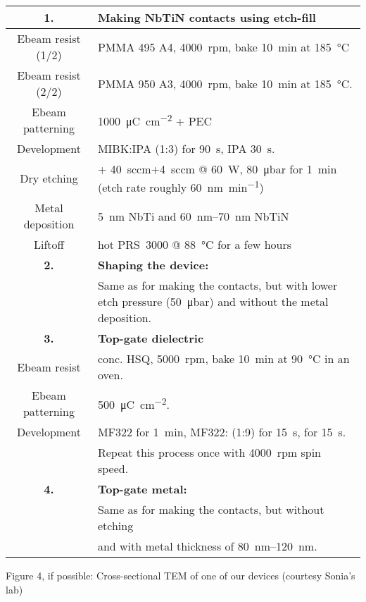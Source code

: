 \noindent
\begin{tabularx}{\textwidth}{@{}cY@{}}
	\hline \hline
	\textbf{1.} & \textbf{Making NbTiN contacts using etch-fill} \\
	\hline
	Ebeam resist (1/2) & PMMA 495 A4, \SI{4000}{rpm}, bake \SI{10}{\minute} at \SI{185}{\celsius} \\
	Ebeam resist (2/2) & PMMA 950 A3, \SI{4000}{rpm}, bake \SI{10}{\minute} at \SI{185}{\celsius}. \\
	Ebeam patterning & \SI{1000}{\micro\coulomb\per\centi\meter\squared} + PEC \\
	Development & MIBK:IPA (1:3) for \SI{90}{\second}, IPA \SI{30}{\second}. \\
	Dry etching & + \SI{40}{sccm}+\SI{4}{sccm} @ \SI{60}{\watt}, \SI{80}{\micro\bar} for \SI{1}{\minute} (etch rate roughly \SI{60}{\nano\meter\per\minute}) \\
	Metal deposition & \SI{5}{\nano\meter} NbTi and \SIrange{60}{70}{\nano\meter} NbTiN \\
	Liftoff & hot PRS~3000 @ \SI{88}{\celsius} for a few hours \\
	\hline
	\textbf{2.} & \textbf{Shaping the device:} \\
	\hline
	& Same as for making the contacts, but with lower etch pressure (\SI{50}{\micro\bar}) and without the metal deposition. \\
	\hline
	\textbf{3.} & \textbf{Top-gate dielectric} \\
	\hline
	Ebeam resist & conc. HSQ, \SI{5000}{rpm}, bake \SI{10}{\minute} at \SI{90}{\celsius} in an oven. \\
	Ebeam patterning & \SI{500}{\micro\coulomb\per\centi\meter\squared}. \\
	Development & MF322 for \SI{1}{\minute}, MF322: (1:9) for \SI{15}{\second},  for \SI{15}{\second}. \\
	& Repeat this process once with \SI{4000}{rpm} spin speed. \\
	\hline 
	\textbf{4.} & \textbf{Top-gate metal: } \\
	\hline
	& Same as for making the contacts, but without etching \\
	& and with metal thickness of \SIrange{80}{120}{\nano\meter}. \\
	\hline \hline
\end{tabularx}


Figure 4, if possible: Cross-sectional TEM of one of our devices (courtesy Sonia's lab)


